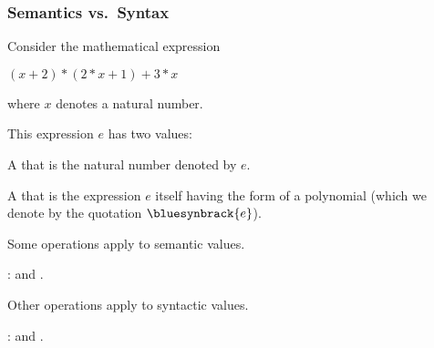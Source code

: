 \documentclass[t,12pt,numbers,fleqn]{beamer}
\begin{document}
\begin{frame}
\frametitle{Semantics  vs.~Syntax}
\bi

  \item Consider the mathematical expression 

  \bi

    \item[] $(x + 2) * (2 * x + 1) + 3 * x$

  \ei

  where $x$ denotes a natural number.

\pause

  \item This expression $e$ has two values:

  \be

\pause

    \item A  that is
      the natural number denoted by $e$.

\pause

    \item A  that is the expression $e$ itself
      having the form of a polynomial (which we denote by the
      quotation $\bluesynbrack{e}$).

  \ee

\pause

  \item Some operations apply to semantic values.

  \bi

    \item {}: \bgreen{$+$} and \bgreen{$*$}.

  \ei

  \item Other operations apply to syntactic values.

  \bi

    \item {}:  and .

  \ei


\ei
\end{frame}

\end{document}
